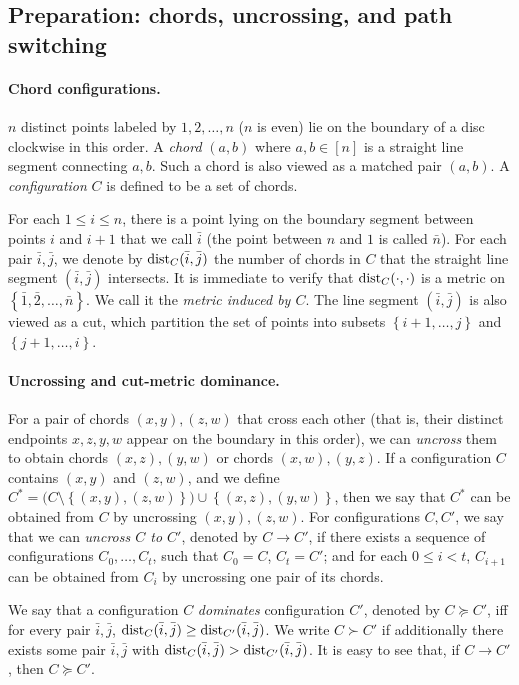 \documentclass[11pt]{article}
\newcommand{\dist}{\textnormal{dist}}
\newcommand{\set}[1]{\left\{ #1 \right\}}
\begin{document}
\subsection{Preparation: chords, uncrossing, and path switching}

\paragraph{Chord configurations.}
$n$ distinct points labeled by $1,2,\ldots,n$ ($n$ is even) lie on the boundary of a disc clockwise in this order. A \emph{chord} $(a,b)$ where $a,b\in [n]$ is a straight line segment connecting $a,b$. Such a chord is also viewed as a matched pair $(a,b)$.
A \emph{configuration} $C$ is defined to be a set of chords.

For each $1\le i\le n$, there is a point lying on the boundary segment between points $i$ and $i+1$ that we call $\bar i$ (the point between $n$ and $1$ is called $\bar n$). For each pair $\bar i, \bar j$, we denote by $\dist_C(\bar i, \bar j)$ the number of chords in $C$ that the straight line segment $(\bar i, \bar j)$ intersects. It is immediate to verify that $\dist_C(\cdot , \cdot)$ is a metric on $\set{\bar 1,\bar 2,\ldots,\bar n}$. We call it the \emph{metric induced by $C$}. The line segment $(\bar i, \bar j)$ is also viewed as a cut, which partition the set of points into subsets $\set{i+1,\ldots,j}$ and $\set{j+1,\ldots,i}$.

\paragraph{Uncrossing and cut-metric dominance.}
For a pair of chords $(x,y),(z,w)$ that cross each other (that is, their distinct endpoints $x,z,y,w$ appear on the boundary in this order), we can \emph{uncross} them to obtain chords $(x,z),(y,w)$ or chords $(x,w),(y,z)$.
%
If a configuration $C$ contains $(x,y)$ and $(z,w)$, and we define $C^*=\big(C\setminus \set{(x,y),(z,w)}\big)\cup \set{(x,z),(y,w)}$, then we say that $C^*$ can be obtained from $C$ by uncrossing $(x,y),(z,w)$.
For configurations $C,C'$, we say that we can \emph{uncross $C$ to $C'$}, denoted by $C\to C'$, if there exists a sequence of configurations $C_0,\ldots,C_t$, such that $C_0=C$, $C_t=C'$; and for each $0\le i<t$, $C_{i+1}$ can be obtained from $C_i$ by uncrossing one pair of its chords.

We say that a configuration $C$ \emph{dominates} configuration $C'$, denoted by $C\succeq C'$, iff for every pair $\bar i,\bar j$, $\dist_C(\bar i,\bar j)\ge \dist_{C'}(\bar i,\bar j)$. We write $C\succ C'$ if additionally there exists some pair $\bar i,\bar j$ with $\dist_C(\bar i,\bar j) > \dist_{C'}(\bar i,\bar j)$. 
It is easy to see that, if $C\to C'$, then $C\succeq C'$. 
\end{document}
